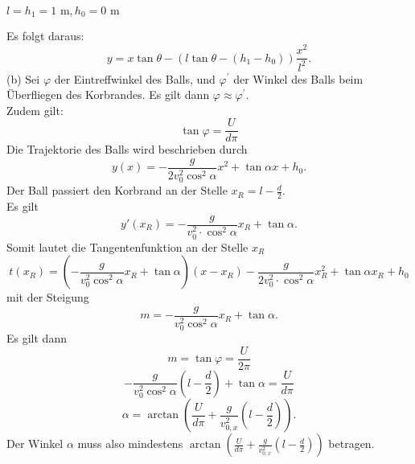 \begin{center}
	$l=h_1=1\text{ m},h_0=0\text{ m}$
	
	
\end{center}
Es folgt daraus:
\[
y=x\tan\theta-(l\tan\theta-(h_1-h_0))\frac{x^2}{l^2}
.\] 
(b)
Sei $\varphi$ der Eintreffwinkel des Balls, und $\varphi^{\prime}$ der Winkel des Balls beim Überfliegen des Korbrandes. Es gilt dann $\varphi\approx \varphi^{\prime}$. \\
Zudem gilt: \[\tan\varphi=\frac{U}{d\pi}\]
Die Trajektorie des Balls wird beschrieben durch \[y(x)=-\frac{g}{2v_0^2\cos ^2\alpha}x^2+\tan \alpha x +h_0.\]
Der Ball passiert den Korbrand an der Stelle $x_R=l-\frac d2$. \\
Es gilt\[y'(x_R)=-\frac{g}{v_0^2\cdot \cos ^2\alpha}x_R+\tan \alpha.\]
Somit lautet die Tangentenfunktion an der Stelle $x_R$ 
\[t(x_R)=\left( -\frac{g}{v_0^2\cos^2 \alpha}x_R+\tan \alpha\right)(x-x_R)-\frac{g}{2v_0^2\cdot \cos ^2\alpha}x_R^2+\tan\alpha x_R+h_0\]
mit der Steigung \[m=-\frac{g}{v_0^2\cos^2 \alpha}x_R+\tan \alpha.\]
Es gilt dann \[m=\tan \varphi =\frac{U}{2\pi}\]\[-\frac{g}{v_0^2\cos^2 \alpha}\left(l-\frac{d}{2}\right)+\tan \alpha=\frac{U}{d\pi}\]\[\alpha=\arctan\left(\frac{U}{d\pi}+\frac{g}{v_{0,x}^2}\left(l-\frac d2\right)\right).\]Der Winkel $\alpha$ muss also mindestens $\arctan\left(\frac{U}{d\pi}+\frac{g}{v_{0,x}^2}\left(l-\frac d2\right)\right)$ betragen. 

